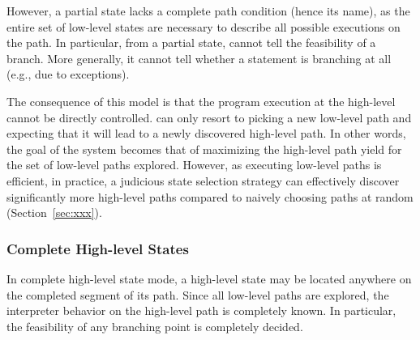 
However, a partial state lacks a complete path condition (hence its name), as the entire set of low-level states are necessary to describe all possible executions on the path.
%
In particular, from a partial state, \chef cannot tell the feasibility of a branch.  More generally, it cannot tell whether a statement is branching at all (e.g., due to exceptions).


The consequence of this model is that the program execution at the high-level cannot be directly controlled.  \chef can only resort to picking a new low-level path and expecting that it will lead to a newly discovered high-level path.
%
In other words, the goal of the system becomes that of maximizing the high-level path yield for the set of low-level paths explored.
%
However, as executing low-level paths is efficient, in practice, a judicious state selection strategy can effectively discover significantly more high-level paths compared to naively choosing paths at random (Section~\ref{sec:xxx}).


\subsubsection{Complete High-level States}


In complete high-level state mode, a high-level state may be located anywhere on the completed segment of its path.
%
Since all low-level paths are explored, the interpreter behavior on the high-level path is completely known.  In particular, the feasibility of any branching point is completely decided.


